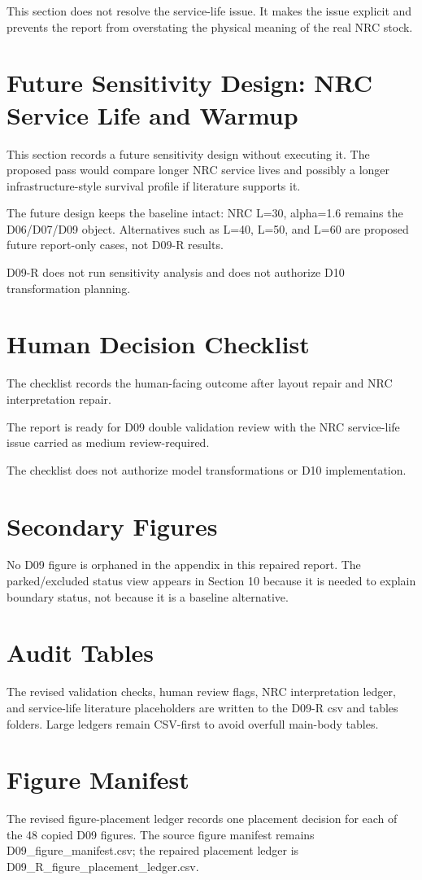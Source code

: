 \documentclass[11pt]{article}
\begin{document}
This section does not resolve the service-life issue. It makes the issue explicit and prevents the report from overstating the physical meaning of the real NRC stock.
\FloatBarrier
\section{Future Sensitivity Design: NRC Service Life and Warmup}
This section records a future sensitivity design without executing it. The proposed pass would compare longer NRC service lives and possibly a longer infrastructure-style survival profile if literature supports it.

The future design keeps the baseline intact: NRC L=30, alpha=1.6 remains the D06/D07/D09 object. Alternatives such as L=40, L=50, and L=60 are proposed future report-only cases, not D09-R results.

D09-R does not run sensitivity analysis and does not authorize D10 transformation planning.

\FloatBarrier
\section{Human Decision Checklist}
The checklist records the human-facing outcome after layout repair and NRC interpretation repair.

The report is ready for D09 double validation review with the NRC service-life issue carried as medium review-required.

The checklist does not authorize model transformations or D10 implementation.

\FloatBarrier
\appendix
\section{Secondary Figures}
No D09 figure is orphaned in the appendix in this repaired report. The parked/excluded status view appears in Section 10 because it is needed to explain boundary status, not because it is a baseline alternative.
\section{Audit Tables}
The revised validation checks, human review flags, NRC interpretation ledger, and service-life literature placeholders are written to the D09-R csv and tables folders. Large ledgers remain CSV-first to avoid overfull main-body tables.
\section{Figure Manifest}
The revised figure-placement ledger records one placement decision for each of the 48 copied D09 figures. The source figure manifest remains D09\_figure\_manifest.csv; the repaired placement ledger is D09\_R\_figure\_placement\_ledger.csv.
\end{document}
